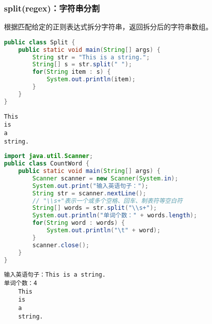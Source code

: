 \subsubsection{split(regex)：字符串分割}

根据匹配给定的正则表达式拆分字符串，返回拆分后的字符串数组。\\


\begin{lstlisting}[language=Java]
public class Split {
	public static void main(String[] args) {
		String str = "This is a string.";
		String[] s = str.split(" ");
		for(String item : s) {
			System.out.println(item);
		}
	}
}
\end{lstlisting}

\begin{tcolorbox}
	\begin{verbatim}
This
is
a
string.
	\end{verbatim}
\end{tcolorbox}

\vspace{0.5cm}


\begin{lstlisting}[language=Java]
import java.util.Scanner;
public class CountWord {
	public static void main(String[] args) {
		Scanner scanner = new Scanner(System.in);
		System.out.print("输入英语句子：");
		String str = scanner.nextLine();
		// "\\s+"表示一个或多个空格、回车、制表符等空白符
		String[] words = str.split("\\s+");
		System.out.println("单词个数：" + words.length);
        for(String word : words) {
			System.out.println("\t" + word);
		}
		scanner.close();
	}
}
\end{lstlisting}

\begin{tcolorbox}
	\begin{verbatim}
输入英语句子：This is a string.
单词个数：4
    This
    is
    a
    string.
	\end{verbatim}
\end{tcolorbox}

\newpage